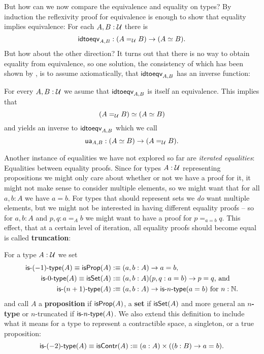 But how can we now compare the equivalence and equality on types?
By induction the reflexivity proof for equivalence is enough to show that
equality implies equivalence:
For each $A, B : \mathcal{U}$ there is
\begin{equation*}
\mathsf{idtoeqv}_{A, B} : (A =_{\mathcal{U}} B) \to (A \simeq B) \text{.}
\end{equation*}
But how about the other direction?
It turns out that there is no way to obtain equality from equivalence,
so one solution,
the consistency of which has been shown by \cite{kapulkinlumsdaine},
is to assume axiomatically, that $\mathsf{idtoeqv}_{A, B}$ has an inverse function:
\begin{axiom}[Univalence]
For every $A, B: \mathcal{U}$ we asume that
$\mathsf{idtoeqv}_{A, B}$ is itself an equivalence.
This implies that
\begin{equation*}
(A =_{\mathcal{U}} B) \simeq (A \simeq B)
\end{equation*}
and yields an inverse to $\mathsf{idtoeqv}_{A, B}$ which we call
\begin{equation*}
\mathsf{ua}_{A, B} : (A \simeq B) \to (A =_{\mathcal{U}} B) \text{.}
\end{equation*}
\end{axiom}

Another instance of equalities we have not explored so far are \emph{iterated equalities}:
Equalities between equality proofs.
Since for types $A : \mathcal{U}$ representing propositions we might only care about whether
or not we have a proof for it, it might not make sense to
consider multiple elements, so we might want that for all $a, b : A$ we have $a = b$.
For types that should represent sets we \emph{do} want multiple elements, but
we might not be interested in having different equality proofs --
so for $a, b : A$ and $p, q : a =_A b$ we might want to have a proof for $p =_{a = b} q$.
This effect, that at a certain level of iteration, all equality proofs should become
equal is called \textbf{truncation}:
\begin{defn}[$n$-types]
For a type $A : \mathcal{U}$ we set
\begin{align*}
\mathsf{is}\mbox{-}{(-1)}\mbox{-}\mathsf{type}{(A)} \equiv \mathsf{isProp}(A) &:\equiv (a, b : A) \to a = b \text{,} \\
\mathsf{is}\mbox{-}{0}\mbox{-}\mathsf{type}{(A)} \equiv \mathsf{isSet}(A)  &:\equiv (a, b : A)(p, q : a = b) \to p = q \text{, and} \\
\mathsf{is}\mbox{-}{(n + 1)}\mbox{-}\mathsf{type}{(A)} &:\equiv (a, b : A) \to \mathsf{is}\mbox{-}{n}\mbox{-}\mathsf{type}{(a = b)} \text{ for $n : \mathbb{N}$.}
\end{align*}
and call $A$ a \textbf{proposition} if $\mathsf{isProp}(A)$, a \textbf{set} if $\mathsf{isSet}(A)$ and more
general an
\textbf{$n$-type} or $n$-truncated if $\mathsf{is}\mbox{-}{n}\mbox{-}\mathsf{type}{(A)}$.
We also extend this definition to include what it means for a type to represent a
contractible space, a singleton, or a true proposition:
\begin{equation*}
\mathsf{is}\mbox{-}{(-2)}\mbox{-}\mathsf{type}{(A)} \equiv \mathsf{isContr}(A) :\equiv (a : A) \times ((b : B) \to a = b) \text{.}
\end{equation*}
\end{defn}

